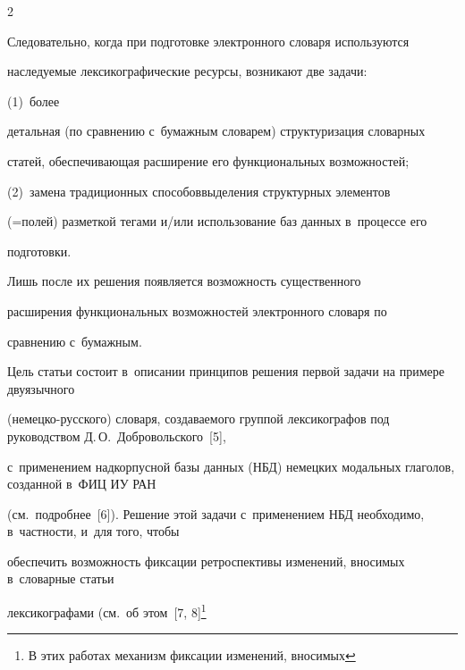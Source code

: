 \begin{multicols}{2}
\begin{table}
\end{table}


  


  Следовательно, когда при подготовке электронного словаря используются 


наследуемые лексикографические ресурсы, возникают две задачи:\linebreak






(1)~более 


детальная (по сравнению с~бумажным словарем) структуризация словарных 


статей, обес\-пе\-чи\-ва\-ющая расширение его функциональных возможностей; 




(2)~замена традиционных способов\linebreak выделения структурных элементов 


(=\;по\-лей) разметкой тегами и/или использование баз данных в~процессе его 


подготовки. 




Лишь после их решения появляется возможность существенного 


расширения функциональных возможностей электронного словаря по 


сравнению с~бумажным.


  


Цель статьи состоит в~описании принципов решения первой задачи на примере двуязычного 


(не\-мец\-ко-рус\-ско\-го) словаря, создаваемого группой лексикографов под руководством Д.\,О.~Доб\-ро\-вольского~[5], 


с~применением надкорпусной базы данных (НБД) немецких модальных глаголов, созданной в~ФИЦ ИУ РАН 


(см.\ подробнее~[6]). Решение этой задачи с~применением НБД необходимо, в~частности, и~для того, чтобы 


обеспечить возможность фиксации ретроспективы изменений, вносимых в~словарные статьи 


лексикографами (см.\ об этом~[7, 8]\footnote{В этих работах механизм фиксации изменений, вносимых 


}
\end{multicols}

